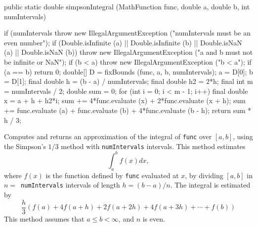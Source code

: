 \begin{htmlonly}
\end{htmlonly}
\begin{code}

   public static double simpsonIntegral (MathFunction func, double a,
                                         double b, int numIntervals) \begin{hide} {
      if (numIntervals %
         throw new IllegalArgumentException
         ("numIntervals must be an even number");
      if (Double.isInfinite (a) || Double.isInfinite (b) ||
         Double.isNaN (a) || Double.isNaN (b))
         throw new IllegalArgumentException
             ("a and b must not be infinite or NaN");
      if (b < a)
         throw new IllegalArgumentException ("b < a");
      if (a == b)
         return 0;
      double[] D = fixBounds (func, a, b, numIntervals);
      a = D[0];
      b = D[1];
      final double h = (b - a) / numIntervals;
      final double h2 = 2*h;
      final int m = numIntervals / 2;
      double sum = 0;
      for (int i = 0; i < m - 1; i++) {
         final double x = a + h + h2*i;
         sum += 4*func.evaluate (x) + 2*func.evaluate (x + h);
      }
      sum += func.evaluate (a) + func.evaluate (b) + 4*func.evaluate (b - h);
      return sum * h / 3;
   }\end{hide}
\end{code}
\begin{tabb}
 Computes and returns an approximation of the integral of \texttt{func} over
 $[a, b]$, using the Simpson's $1/3$ method with \texttt{numIntervals}
 intervals. This method estimates
\[\int_a^b f(x)dx,\]
 where $f(x)$ is the function defined by \texttt{func} evaluated at $x$,
 by dividing $[a, b]$ in $n=$~\texttt{numIntervals} intervals of length
 $h=(b - a)/n$. The integral is estimated by
\[\frac{h}{3}(f(a)+4f(a+h)+2f(a+2h)+4f(a+3h)+\cdots+f(b))\]
This method assumes that $a\le b<\infty$, and $n$ is even.
\end{tabb}
\begin{htmlonly}
\end{htmlonly}

